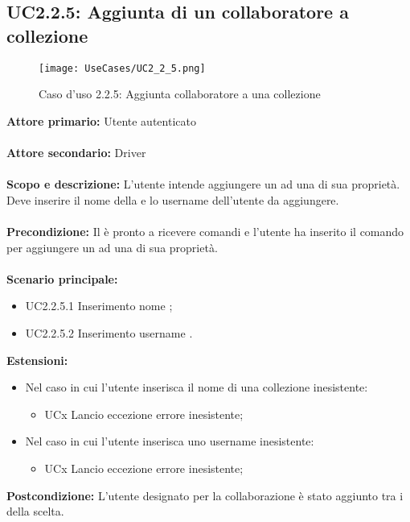 \documentclass{scalatekids-article}
\begin{document}
\subsection{UC2.2.5: Aggiunta di un collaboratore a collezione}
\begin{figure}[H]
  \begin{center}
    \texttt{[image: UseCases/UC2\_2\_5.png]}
    \caption*{Caso d'uso 2.2.5: Aggiunta collaboratore a una collezione}
  \end{center}
\end{figure}
\textbf{Attore primario:} Utente autenticato\\ \\
\textbf{Attore secondario:} Driver\\ \\
\textbf{Scopo e descrizione:} L'utente intende aggiungere un  ad una  di sua proprietà. Deve inserire il nome della  e lo username dell'utente da aggiungere.\\ \\
\textbf{Precondizione:} Il  è pronto a ricevere comandi e l'utente ha inserito il comando per aggiungere un  ad una  di sua proprietà.\\ \\
\textbf{Scenario principale:}
\begin{itemize}
\item UC2.2.5.1 Inserimento nome ;
\item UC2.2.5.2 Inserimento username .
\end{itemize}
\textbf{Estensioni:}
\begin{itemize}
  \item Nel caso in cui l'utente inserisca il nome di una collezione inesistente:
  \begin{itemize}
    \item UCx Lancio eccezione errore  inesistente;
  \end{itemize}
  \item Nel caso in cui l'utente inserisca uno username inesistente:
  \begin{itemize}
    \item UCx Lancio eccezione errore  inesistente;
  \end{itemize}
\end{itemize}
\textbf{Postcondizione:} L'utente designato per la collaborazione è stato aggiunto tra i  della  scelta.
\end{document}

